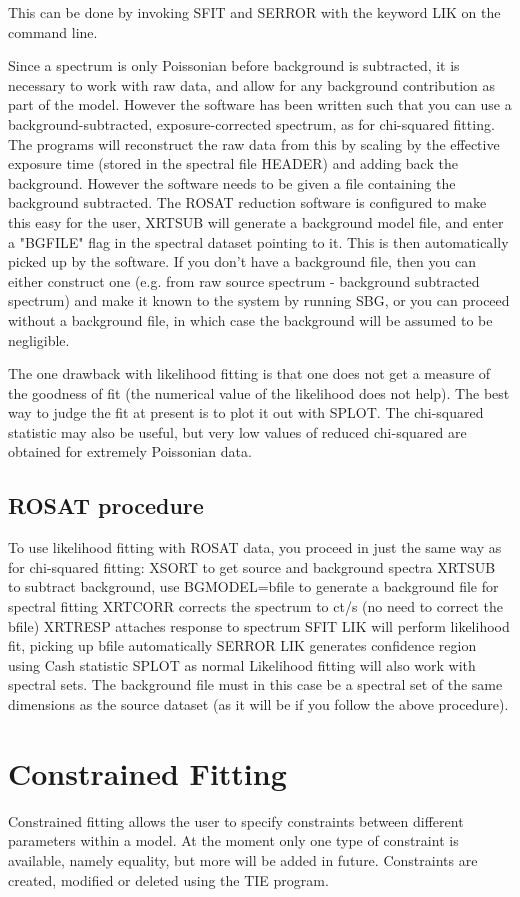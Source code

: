\documentclass{book}
\renewcommand{\_}{{\tt\char'137}}     %
\begin{document}
This can be done by invoking SFIT and SERROR with the keyword LIK on
the command line.
 
Since a spectrum is only Poissonian before background is subtracted,
it is necessary to work with raw data, and allow for any background
contribution as part of the model. However the software has been
written such that you can use a background-subtracted,
exposure-corrected spectrum, as for chi-squared fitting. The programs
will reconstruct the raw data from this by scaling by the effective
exposure time (stored in the spectral file HEADER) and adding back the
background. However the software needs to be given a file containing
the background subtracted. The ROSAT reduction software is configured
to make this easy for the user, XRTSUB will generate a background
model file, and enter a "BGFILE" flag in the spectral dataset pointing
to it. This is then automatically picked up by the software.
If you don't have a background file, then you can either construct
one (e.g. from raw source spectrum - background subtracted spectrum)
and make it known to the system by running SBG, or you can proceed
without a background file, in which case the background will be
assumed to be negligible.
 
The one drawback with likelihood fitting is that one does not get
a measure of the goodness of fit (the numerical value of the
likelihood does not help). The best way to judge the fit at
present is to plot it out with SPLOT. The chi-squared statistic
may also be useful, but very low values of reduced chi-squared
are obtained for extremely Poissonian data.
 
\subsection{ROSAT procedure}
To use likelihood fitting with ROSAT data, you proceed in just the
same way as for chi-squared fitting:
XSORT to get source and background spectra
XRTSUB to subtract background, use BGMODEL=bfile to
generate a background file for spectral fitting
XRTCORR corrects the spectrum to ct/s (no need to
correct the bfile)
XRTRESP attaches response to spectrum
SFIT LIK will perform likelihood fit, picking up bfile
automatically
SERROR LIK generates confidence region using Cash statistic
SPLOT as normal
Likelihood fitting will also work with spectral sets. The background
file must in this case be a spectral set of the same dimensions as
the source dataset (as it will be if you follow the above procedure).
\section{Constrained Fitting}
Constrained fitting allows the user to specify constraints between
different parameters within a model. At the moment only one type of
constraint is available, namely equality, but more will be added in
future. Constraints are created, modified or deleted using the TIE
program.
 
\end{document}
